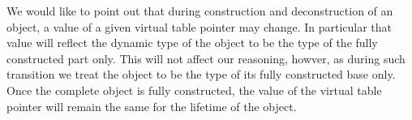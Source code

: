 \documentclass[preprint]{sigplanconf}
\begin{document}
We would like to point out that during construction and deconstruction of an 
object, a value of a given virtual table pointer may change. In particular that 
value will reflect the dynamic type of the object to be the type of the fully 
constructed part only. This will not affect our reasoning, howver, as during 
such transition we treat the object to be the type of its fully constructed 
base only. Once the complete object is fully constructed, the value of the 
virtual table pointer will remain the same for the lifetime of the object.

\end{document}
